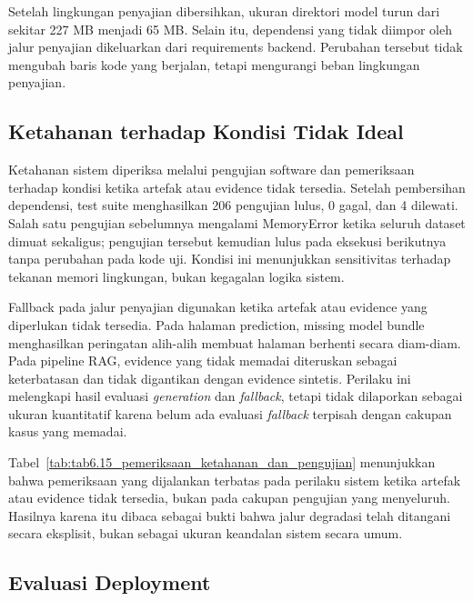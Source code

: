 Setelah lingkungan penyajian dibersihkan, ukuran direktori model turun dari sekitar 227 MB menjadi 65 MB. Selain itu, dependensi yang tidak diimpor
oleh jalur penyajian dikeluarkan dari requirements backend. Perubahan tersebut tidak mengubah baris kode yang berjalan, tetapi mengurangi beban lingkungan
penyajian.

\subsection{Ketahanan terhadap Kondisi Tidak Ideal}
\label{subsec:bab6-ketahanan-kondisi-tidak-ideal}

Ketahanan sistem diperiksa melalui pengujian software dan pemeriksaan terhadap kondisi ketika artefak atau evidence tidak tersedia. Setelah pembersihan
dependensi, test suite menghasilkan 206 pengujian lulus, 0 gagal, dan 4 dilewati. Salah satu pengujian sebelumnya mengalami MemoryError ketika seluruh
dataset dimuat sekaligus; pengujian tersebut kemudian lulus pada eksekusi berikutnya tanpa perubahan pada kode uji. Kondisi ini menunjukkan sensitivitas
terhadap tekanan memori lingkungan, bukan kegagalan logika sistem.

Fallback pada jalur penyajian digunakan ketika artefak atau evidence yang diperlukan tidak tersedia. Pada halaman prediction, missing model bundle
menghasilkan peringatan alih-alih membuat halaman berhenti secara diam-diam. Pada pipeline RAG, evidence yang tidak memadai diteruskan sebagai
keterbatasan dan tidak digantikan dengan evidence sintetis. Perilaku ini melengkapi hasil evaluasi \textit{generation} dan \textit{fallback}, tetapi tidak dilaporkan sebagai ukuran kuantitatif karena belum ada
evaluasi \textit{fallback} terpisah dengan cakupan kasus yang memadai.



Tabel~\ref{tab:tab6.15_pemeriksaan_ketahanan_dan_pengujian} menunjukkan bahwa pemeriksaan yang dijalankan terbatas pada perilaku sistem ketika artefak atau evidence tidak tersedia, bukan pada cakupan
pengujian yang menyeluruh. Hasilnya karena itu dibaca sebagai bukti bahwa jalur degradasi telah ditangani secara eksplisit, bukan sebagai ukuran keandalan
sistem secara umum.

\subsection{Evaluasi Deployment}
\label{subsec:bab6-evaluasi-deployment}

